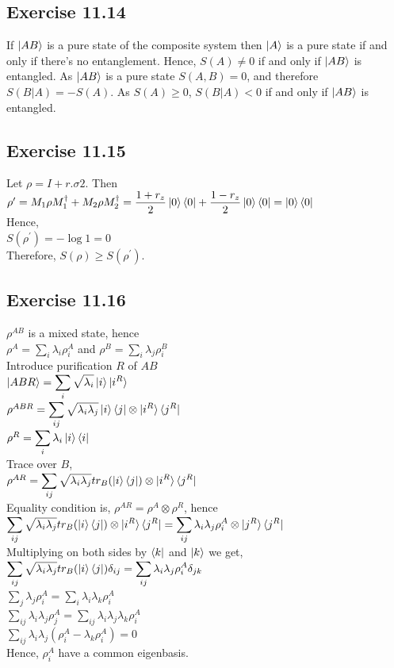 \documentclass[a4paper,12pt]{article}
\begin{document}
\subsection*{Exercise 11.14}
If $\ket{AB}$ is a pure state of the composite system then $\ket{A}$ is a pure state
if and only if there's no entanglement. Hence, $S(A)\neq 0$ if and only if $\ket{AB}$ is
entangled. As $\ket{AB}$ is a pure state $S(A,B)=0$, and therefore
$S(B|A)=-S(A)$. As $S(A)\geq 0$, $S(B|A)<0$ if and only if $\ket{AB}$ is entangled.
\subsection*{Exercise 11.15}
Let $\rho=\displaystyle{I+r.\sigma}{2}$. Then\\
$\rho^\prime=M_1\rho M_1^\dagger +M_2\rho M_2^\dagger=\displaystyle
\frac{1+r_z}{2}\ket{0}\bra{0}+\frac{1-r_z}{2}\ket{0}\bra{0}=\ket{0}\bra{0}$\\
Hence,\\
$S(\rho^\prime)=-\log{1}=0$\\
Therefore, $S(\rho)\geq S(\rho^\prime)$.
\subsection*{Exercise 11.16}
$\rho^{AB}$ is a mixed state, hence\\
$\rho^A=\displaystyle\sum_i\lambda_i\rho_i^A$ and
$\rho^B=\displaystyle\sum_i\lambda_j\rho_i^B$\\
Introduce purification $R$ of $AB$\\
$\ket{ABR}=\displaystyle\sum_i\sqrt{\lambda_i}\ket{i}\ket{i^R}$\\
$\rho^{ABR}=\displaystyle\sum_{ij}\sqrt{\lambda_i\lambda_j}\ket{i}\bra{j}\otimes\ket{i^R}\bra{j^R}$\\
$\rho^R=\displaystyle\sum_{i}\lambda_i\ket{i}\bra{i}$\\
Trace over $B$,\\
$\rho^{AR}=\displaystyle\sum_{ij}\sqrt{\lambda_i\lambda_j}tr_B(\ket{i}\bra{j})\otimes\ket{i^R}\bra{j^R}$\\
Equality condition is, $\rho^{AR}=\rho^A\otimes\rho^R$, hence\\
$\displaystyle\sum_{ij}\sqrt{\lambda_i\lambda_j}tr_B(\ket{i}\bra{j})\otimes\ket{i^R}\bra{j^R}=
\sum_{ij}\lambda_i\lambda_j\rho_i^A\otimes\ket{j^R}\bra{j^R}$\\
Multiplying on both sides by $\bra{k}$ and $\ket{k}$ we get,\\
$\displaystyle\sum_{ij}\sqrt{\lambda_i\lambda_j}tr_B(\ket{i}\bra{j})\delta_{ij}=
\sum_{ij}\lambda_i\lambda_j\rho_i^A\delta_{jk}$\\
$\displaystyle\sum_{j}\lambda_j\rho_i^A=
\sum_{i}\lambda_i\lambda_k\rho_i^A$\\
$\displaystyle\sum_{ij}\lambda_i\lambda_j\rho_j^A=
\sum_{ij}\lambda_i\lambda_j\lambda_k\rho_i^A$\\
$\displaystyle\sum_{ij}\lambda_i\lambda_j(\rho_i^A-\lambda_k\rho_i^A)=0$\\
Hence, $\rho_i^A$ have a common eigenbasis.
\end{document}
